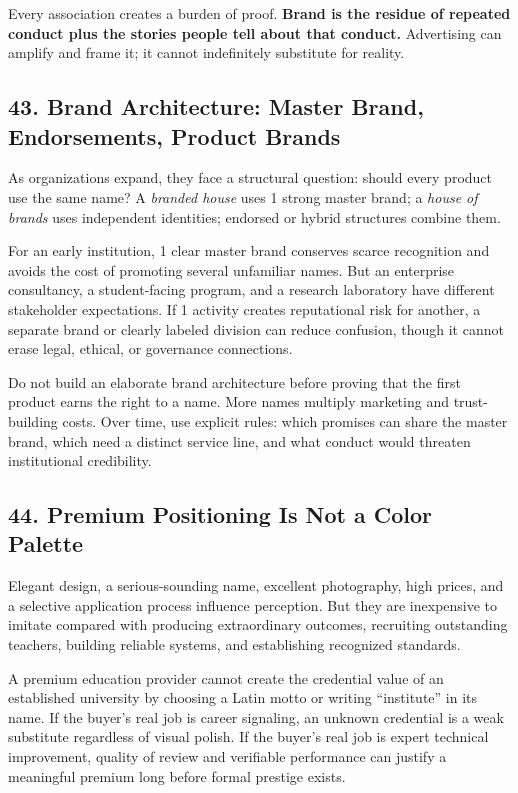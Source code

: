Every association creates a burden of proof. \textbf{Brand is the residue of repeated conduct plus the stories people tell about that conduct.} Advertising can amplify and frame it; it cannot indefinitely substitute for reality.

\subsection*{43. Brand Architecture: Master Brand, Endorsements, Product Brands}

As organizations expand, they face a structural question: should every product use the same name? A \emph{branded house} uses 1 strong master brand; a \emph{house of brands} uses independent identities; endorsed or hybrid structures combine them.

For an early institution, 1 clear master brand conserves scarce recognition and avoids the cost of promoting several unfamiliar names. But an enterprise consultancy, a student-facing program, and a research laboratory have different stakeholder expectations. If 1 activity creates reputational risk for another, a separate brand or clearly labeled division can reduce confusion, though it cannot erase legal, ethical, or governance connections.

Do not build an elaborate brand architecture before proving that the first product earns the right to a name. More names multiply marketing and trust-building costs. Over time, use explicit rules: which promises can share the master brand, which need a distinct service line, and what conduct would threaten institutional credibility.

\subsection*{44. Premium Positioning Is Not a Color Palette}

Elegant design, a serious-sounding name, excellent photography, high prices, and a selective application process influence perception. But they are inexpensive to imitate compared with producing extraordinary outcomes, recruiting outstanding teachers, building reliable systems, and establishing recognized standards.

A premium education provider cannot create the credential value of an established university by choosing a Latin motto or writing ``institute'' in its name. If the buyer's real job is career signaling, an unknown credential is a weak substitute regardless of visual polish. If the buyer's real job is expert technical improvement, quality of review and verifiable performance can justify a meaningful premium long before formal prestige exists.

